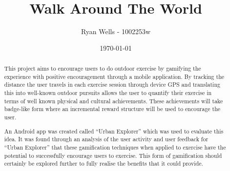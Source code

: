 \documentclass{l4proj}
\begin{document}
\newcommand{\todo}[1]{\textcolor{red}{#1}}
	
	
\title{Walk Around The World}
\author{Ryan Wells - 1002253w}
\date{\today}
\maketitle
\begin{abstract}

This project aims to encourage users to do outdoor 
exercise by gamifying the experience with positive encouragement
through a mobile application. By tracking the distance the user
travels in each exercise session through device GPS and translating
this into well-known outdoor pursuits allows the user to quantify
their exercise in terms of well known physical and cultural
achievements. These achievements will take badge-like form where an
incremental reward structure will be used to encourage the user. 




An Android app was created called ``Urban Explorer'' which was used to
evaluate this idea. It was found through an analysis of the user
activity and user feedback for ``Urban Explorer'' that these
gamification techniques when applied to exercise have the potential to
successfully encourage users to exercise. This form of gamification
should certainly be explored further to fully realise the benefits
that it could provide. 


\end{abstract}
\end{document}
